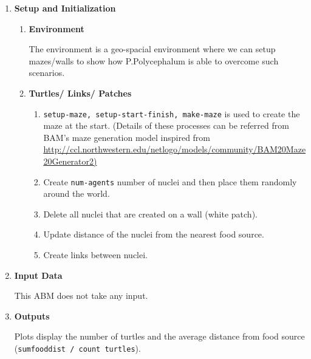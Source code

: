 \documentclass[a4paper, 12pt]{article}
\begin{document}
\begin{enumerate}
    
    \item \textbf{Setup and Initialization}
    \begin{enumerate}
        \item \textbf{Environment}\par
        The environment is a geo-spacial environment where we can setup mazes/walls to show how P.Polycephalum is able to overcome such scenarios.
        \item \textbf{Turtles/ Links/ Patches}
        \begin{enumerate}
            \item \texttt{setup-maze, setup-start-finish, make-maze} is used to create the maze at the start. (Details of these processes can be referred from BAM's maze generation model inspired from \url{http://ccl.northwestern.edu/netlogo/models/community/BAM20Maze20Generator2)}
            \item Create \texttt{num-agents} number of nuclei and then place them randomly around the world. 
            \item Delete all nuclei that are created on a wall (white patch). 
            \item Update distance of the nuclei from the nearest food source.
            \item Create links between nuclei.  
        \end{enumerate}
    \end{enumerate}
    \item \textbf{Input Data} \par
    This ABM does not take any input.
    \item \textbf{Outputs} \par
    Plots display the number of turtles and the average distance from food source (\texttt{sumfooddist / count turtles}).
    

\end{enumerate}
\end{document}
